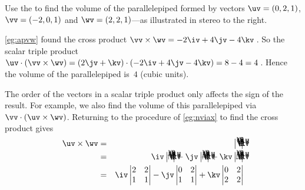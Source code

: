 \begin{example} \label{eg:stppv}
Use the  to find the volume of the parallelepiped formed by vectors \(\uv=(0,2,1)\), \(\vv=(-2,0,1)\) and \(\wv=(2,2,1)\)---as illustrated in stereo to the right.

\begin{solution} 
\cref{eg:apvw} found the cross product \(\vv\times\wv=-2\iv+4\jv-4\kv\)\,.
So the scalar triple product \(\uv\cdot(\vv\times\wv)=(2\jv+\kv)\cdot(-2\iv+4\jv-4\kv)=8-4=4\)\,.
Hence the volume of the parallelepiped is~\(4\) (cubic units). 

The order of the vectors in a scalar triple product only affects the sign of the result.  
For example, we also find the volume of this parallelepiped via~\(\vv\cdot(\uv\times\wv)\).
Returning to the procedure of \cref{eg:nviax} to find the cross product gives
\setlength{\unitlength}{1.2ex}
\def\abc#1{\begin{vmatrix}\begin{picture}(5.3,6)
\put(0,4){$\iv$}\put(2,4){$0$}\put(4,4){$2$}
\put(0,2){$\jv$}\put(2,2){$2$}\put(4,2){$2$}
\put(0,0){$\kv$}\put(2,0){$1$}\put(4,0){$1$}
\ifnum1=#1\put(0.5,-0.5){\line(0,1)6}\put(-0.5,4.5){\line(1,0)6}\fi
\ifnum2=#1\put(0.5,-0.5){\line(0,1)6}\put(-0.5,2.5){\line(1,0)6}\fi
\ifnum3=#1\put(0.5,-0.5){\line(0,1)6}\put(-0.5,0.5){\line(1,0)6}\fi
\end{picture}\end{vmatrix}}
\def\ab#1#2#3#4{\begin{vmatrix}\begin{picture}(3,4)
\put(0,2){$#1$}\put(2,2){$#2$}
\put(0,0){$#3$}\put(2,0){$#4$}
\color{red}\put(-0.5,-0.5){\line(1,1)4}
\color{blue}\put(-0.5,3.5){\line(1,-1)4}
\end{picture}\end{vmatrix}}
\begin{eqnarray*}
\uv\times\wv&=& \abc0 
\\&=&\iv\abc1-\jv\abc2+\kv\abc3
\\&=&\iv\begin{vmatrix} 2&2\\1&1 \end{vmatrix}
-\jv\begin{vmatrix} 0&2\\1&1 \end{vmatrix}
+\kv\begin{vmatrix} 0&2\\2&2 \end{vmatrix}

\end{eqnarray*}
\end{solution}
\end{example}
